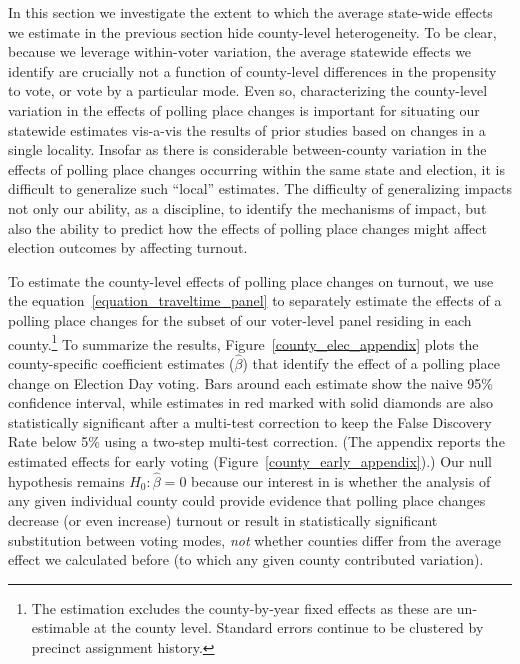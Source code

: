 \documentclass{cup_PSRM}
\begin{document}
\noindent In this section we investigate the extent to which the average state-wide effects we estimate in the previous section hide county-level heterogeneity.  To be clear, because we leverage within-voter variation, the average statewide effects we identify are crucially not a function of county-level differences in the propensity to vote, or vote by a particular mode.  Even so, characterizing the county-level variation in the effects of polling place changes is important for situating our statewide estimates vis-a-vis the results of prior studies based on changes in a single locality.  Insofar as there is considerable between-county variation in the effects of polling place changes occurring within the same state and election, it is difficult to generalize such ``local'' estimates.  The difficulty of generalizing impacts not only our ability, as a discipline, to identify the mechanisms of impact, but also the ability to predict how the effects of polling place changes might affect election outcomes by affecting turnout.

To estimate the county-level effects of polling place changes on turnout, we use the equation~\ref{equation_traveltime_panel} to separately estimate the effects of a polling place changes for the subset of our voter-level panel residing in each county.\footnote{The estimation excludes the county-by-year fixed effects as these are un-estimable at the county level.  Standard errors continue to be clustered by precinct assignment history.}  To summarize the results, Figure~\ref{county_elec_appendix} plots the county-specific coefficient estimates ($\hat{\beta}$) that identify the effect of a polling place change on Election Day voting. Bars around each estimate show the naive 95\% confidence interval, while estimates in red marked with solid diamonds are also statistically significant after a multi-test correction to keep the False Discovery Rate below 5\% using a \cite{Benjamini:2006gd} two-step multi-test correction. (The appendix reports the estimated effects for early voting (Figure~\ref{county_early_appendix}).)  Our null hypothesis remains $H_{0}: \hat{\beta}=0$ because our interest in is whether the analysis of any given individual county could provide evidence that polling place changes decrease (or even increase) turnout or result in statistically significant substitution between voting modes, \emph{not} whether counties differ from the average effect we calculated before (to which any given county contributed variation).
\end{document}
